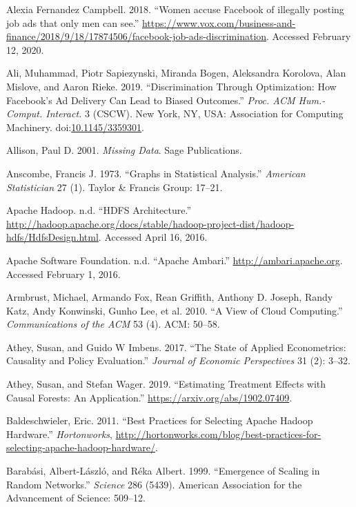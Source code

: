 \documentclass[]{krantz}
\begin{document}
\hypertarget{ref-campbell2018}{}
Alexia Fernandez Campbell. 2018. ``Women accuse Facebook of illegally
posting job ads that only men can see.''
\url{https://www.vox.com/business-and-finance/2018/9/18/17874506/facebook-job-ads-discrimination}.
Accessed February 12, 2020.

\hypertarget{ref-ali2019}{}
Ali, Muhammad, Piotr Sapiezynski, Miranda Bogen, Aleksandra Korolova,
Alan Mislove, and Aaron Rieke. 2019. ``Discrimination Through
Optimization: How Facebook's Ad Delivery Can Lead to Biased Outcomes.''
\emph{Proc. ACM Hum.-Comput. Interact.} 3 (CSCW). New York, NY, USA:
Association for Computing Machinery.
doi:\href{https://doi.org/10.1145/3359301}{10.1145/3359301}.

\hypertarget{ref-allison2001missing}{}
Allison, Paul D. 2001. \emph{Missing Data}. Sage Publications.

\hypertarget{ref-anscombe1973graphs}{}
Anscombe, Francis J. 1973. ``Graphs in Statistical Analysis.''
\emph{American Statistician} 27 (1). Taylor \& Francis Group: 17--21.

\hypertarget{ref-HDFS}{}
Apache Hadoop. n.d. ``HDFS Architecture.''
\url{http://hadoop.apache.org/docs/stable/hadoop-project-dist/hadoop-hdfs/HdfsDesign.html}.
Accessed April 16, 2016.

\hypertarget{ref-ApacheAmbari}{}
Apache Software Foundation. n.d. ``Apache Ambari.''
\url{http://ambari.apache.org}. Accessed February 1, 2016.

\hypertarget{ref-armbrust2010view}{}
Armbrust, Michael, Armando Fox, Rean Griffith, Anthony D. Joseph, Randy
Katz, Andy Konwinski, Gunho Lee, et al. 2010. ``A View of Cloud
Computing.'' \emph{Communications of the ACM} 53 (4). ACM: 50--58.

\hypertarget{ref-athey2017state}{}
Athey, Susan, and Guido W Imbens. 2017. ``The State of Applied
Econometrics: Causality and Policy Evaluation.'' \emph{Journal of
Economic Perspectives} 31 (2): 3--32.

\hypertarget{ref-athey2019}{}
Athey, Susan, and Stefan Wager. 2019. ``Estimating Treatment Effects
with Causal Forests: An Application.''
\url{https://arxiv.org/abs/1902.07409}.

\hypertarget{ref-Provisioning}{}
Baldeschwieler, Eric. 2011. ``Best Practices for Selecting Apache Hadoop
Hardware.'' \emph{Hortonworks},
\url{http://hortonworks.com/blog/best-practices-for-selecting-apache-hadoop-hardware/}.

\hypertarget{ref-barabasi1999emergence}{}
Barabási, Albert-László, and Réka Albert. 1999. ``Emergence of Scaling
in Random Networks.'' \emph{Science} 286 (5439). American Association
for the Advancement of Science: 509--12.
\end{document}
